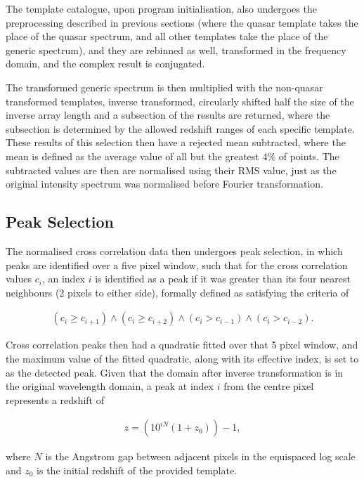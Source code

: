 \documentclass[titlesmallcaps, examinerscopy, copyrightpage]{uqthesis}
\newcommand{\brac}[1]{\left( #1 \right)}
\begin{document}
The template catalogue, upon program initialisation, also undergoes the preprocessing described in previous sections (where the quasar template takes the place of the quasar spectrum, and all other templates take the place of the generic spectrum), and they are rebinned as well, transformed in the frequency domain, and the complex result is conjugated.

The transformed generic spectrum is then multiplied with the non-quasar transformed templates, inverse transformed, circularly shifted half the size of the inverse array length and a subsection of the results are returned, where the subsection is determined by the allowed redshift ranges of each specific template. These results of this selection then have a rejected mean subtracted, where the mean is defined as the average value of all but the greatest 4\% of points. The subtracted values are then are normalised using their RMS value, just as the original intensity spectrum was normalised before Fourier transformation.

\subsection{Peak Selection}

The normalised cross correlation data then undergoes peak selection, in which peaks are identified over a five pixel window, such that for the cross correlation values $c_i$, an index $i$ is identified as a peak if it was greater than its four nearest neighbours (2 pixels to either side), formally defined as satisfying the criteria of

\begin{align}
\brac{c_i \geq c_{i+1}} \land \brac{c_i \geq c_{i+2}} \land \brac{c_i > c_{i-1}} \land \brac{c_i > c_{i-2}}.
\end{align}

Cross correlation peaks then had a quadratic fitted over that 5 pixel window, and the maximum value of the fitted quadratic, along with its effective index, is set to as the detected peak. Given that the domain after inverse transformation is in the original wavelength domain, a peak at index $i$ from the centre pixel represents a redshift of 

\begin{align}
z = \brac{10^{iN} (1+z_0)} - 1,
\end{align}

where $N$ is the Angstrom gap between adjacent pixels in the equispaced log scale and $z_0$ is the initial redshift of the provided template.
\end{document}
